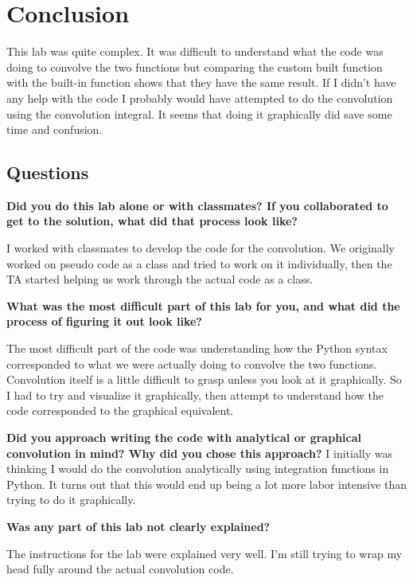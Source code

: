 \documentclass{article}
\begin{document}
\section*{Conclusion}
This lab was quite complex. It was difficult to understand what the code was doing to convolve the two functions but comparing the custom built function with the built-in function shows that they have the same result. If I didn't have any help with the code I probably would have attempted to do the convolution using the convolution integral. It seems that doing it graphically did save some time and confusion.

\subsection*{Questions}
\textbf{Did you do this lab alone or with classmates? If you collaborated to get to the solution, what did that process look like?}
\vspace{5mm}

I worked with classmates to develop the code for the convolution. We originally worked on pseudo code as a class and tried to work on it individually, then the TA started helping us work through the actual code as a class.
\vspace{5mm}

\textbf{What was the most difficult part of this lab for you, and what did the process of figuring it out look like?}
\vspace{5mm}

The most difficult part of the code was understanding how the Python syntax corresponded to what we were actually doing to convolve the two functions. Convolution itself is a little difficult to grasp unless you look at it graphically. So I had to try and visualize it graphically, then attempt to understand how the code corresponded to the graphical equivalent.
\vspace{5mm}

\textbf{Did you approach writing the code with analytical or graphical convolution in mind? Why did you chose this
approach?}
\vspace{5mm}
I initially was thinking I would do the convolution analytically using integration functions in Python. It turns out that this would end up being a lot more labor intensive than trying to do it graphically.
\vspace{5mm}

\textbf{Was any part of this lab not clearly explained?}

\vspace{5mm}
The instructions for the lab were explained very well. I'm still trying to wrap my head fully around the actual convolution code.
\end{document}
